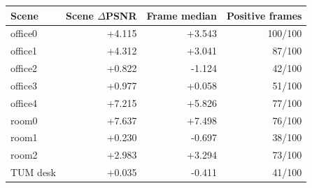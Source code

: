 \begin{tabular}{@{}lrrr@{}}
\toprule
Scene & Scene $\Delta$PSNR & Frame median & Positive frames\\
\midrule
office0 & +4.115 & +3.543 & 100/100 \\
office1 & +4.312 & +3.041 & 87/100 \\
office2 & +0.822 & -1.124 & 42/100 \\
office3 & +0.977 & +0.058 & 51/100 \\
office4 & +7.215 & +5.826 & 77/100 \\
room0 & +7.637 & +7.498 & 76/100 \\
room1 & +0.230 & -0.697 & 38/100 \\
room2 & +2.983 & +3.294 & 73/100 \\
TUM desk & +0.035 & -0.411 & 41/100 \\
\bottomrule
\end{tabular}

